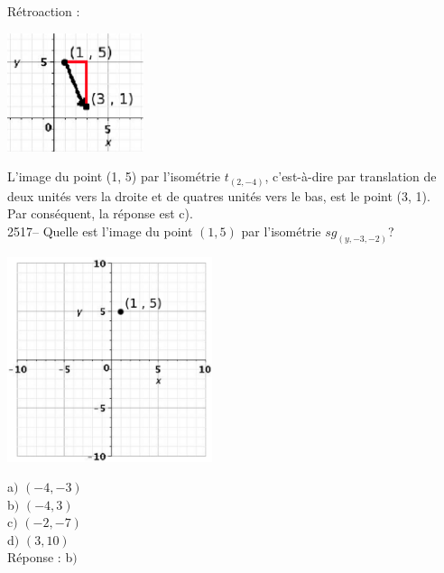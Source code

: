 \documentclass[letterpaper, 12pt]{article}
\begin{document}
R\'etroaction :\\
\begin{center}
 \includegraphics[width=4cm,bb=14 14 238 208]{Q2516r.eps}
\end{center}
L'image du point (1, 5) par l'isom\'etrie $t_{(2 , -4)}$, c'est-\`a-dire par translation de deux unit\'es vers la droite et de quatres unit\'es vers le bas, est le point (3, 1).\\
Par cons\'equent, la r\'eponse est c).\\

2517-- Quelle est l'image du point $(1, 5)$ par l'isom\'etrie $sg_{(y , -3 , -2)}$?\\
\begin{center}
 \includegraphics[width=6cm,bb=14 14 415 415]{Q2516.eps}
\end{center}

a$)$ $(-4, -3)$\\
b$)$ $(-4, 3)$\\
c$)$ $(-2, -7)$\\
d$)$ $(3, 10)$\\

R\'eponse : b$)$\\
\end{document}
